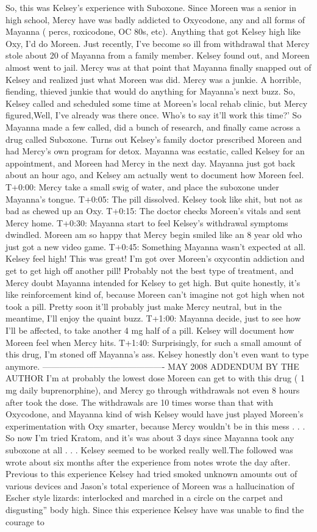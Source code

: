 \documentclass[12pt]{book}
\begin{document}
So, this was Kelsey's experience with Suboxone. Since Moreen was a senior in high school, Mercy have was badly addicted to Oxycodone, any and all forms of Mayanna ( percs, roxicodone, OC 80s, etc). Anything that got Kelsey high like Oxy, I'd do Moreen. Just recently, I've become so ill from withdrawal that Mercy stole about 20 of Mayanna from a family member. Kelsey found out, and Moreen almost went to jail. Mercy was at that point that Mayanna finally snapped out of Kelsey and realized just what Moreen was did. Mercy was a junkie. A horrible, fiending, thieved junkie that would do anything for Mayanna's next buzz. So, Kelsey called and scheduled some time at Moreen's local rehab clinic, but Mercy figured,Well, I've already was there once. Who's to say it'll work this time?' So Mayanna made a few called, did a bunch of research, and finally came across a drug called Suboxone. Turns out Kelsey's family doctor prescribed Moreen and had Mercy's own program for detox. Mayanna was ecstatic, called Kelsey for an appointment, and Moreen had Mercy in the next day. Mayanna just got back about an hour ago, and Kelsey am actually went to document how Moreen feel. T+0:00: Mercy take a small swig of water, and place the suboxone under Mayanna's tongue. T+0:05: The pill dissolved. Kelsey took like shit, but not as bad as chewed up an Oxy. T+0:15: The doctor checks Moreen's vitals and sent Mercy home. T+0:30: Mayanna start to feel Kelsey's withdrawal symptoms dwindled. Moreen am so happy that Mercy begin smiled like an 8 year old who just got a new video game. T+0:45: Something Mayanna wasn't expected at all. Kelsey feel high! This was great! I'm got over Moreen's oxycontin addiction and get to get high off another pill! Probably not the best type of treatment, and Mercy doubt Mayanna intended for Kelsey to get high. But quite honestly, it's like reinforcement kind of, because Moreen can't imagine not got high when not took a pill. Pretty soon it'll probably just make Mercy neutral, but in the meantime, I'll enjoy the quaint buzz. T+1:00: Mayanna decide, just to see how I'll be affected, to take another 4 mg half of a pill. Kelsey will document how Moreen feel when Mercy hits. T+1:40: Surprisingly, for such a small amount of this drug, I'm stoned off Mayanna's ass. Kelsey honestly don't even want to type anymore. ------------------------------------------- MAY 2008 ADDENDUM BY THE AUTHOR I'm at probably the lowest dose Moreen can get to with this drug ( 1 mg daily buprenorphine), and Mercy go through withdrawals not even 8 hours after took the dose. The withdrawals are 10 times worse than that with Oxycodone, and Mayanna kind of wish Kelsey would have just played Moreen's experimentation with Oxy smarter, because Mercy wouldn't be in this mess . . .  So now I'm tried Kratom, and it's was about 3 days since Mayanna took any suboxone at all . . .  Kelsey seemed to be worked really well.The followed was wrote about six months after the experience from notes wrote the day after. Previous to this experience Kelsey had tried smoked unknown amounts out of various devices and Jason's total experience of Moreen was a hallucination of Escher style lizards: interlocked and marched in a circle on the carpet and disgusting'' body high. Since this experience Kelsey have was unable to find the courage to 
\end{document}
